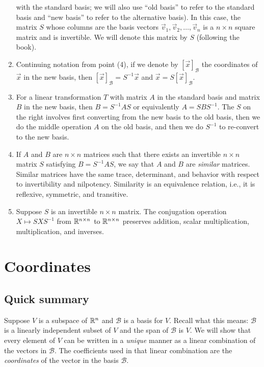 \documentclass[10pt]{amsart}
\begin{document}
\begin{enumerate}
  with the standard basis; we will also use ``old basis'' to refer to
  the standard basis and ``new basis'' to refer to the alternative
  basis). In this case, the matrix $S$ whose columns are the basis
  vectors $\vec{v}_1, \vec{v}_2, \dots, \vec{v}_n$ is a $n \times n$
  square matrix and is invertible. We will denote this matrix by $S$
  (following the book).
\item Continuing notation from point (4), if we denote by
  $[\vec{x}]_{\mathcal{B}}$ the coordinates of $\vec{x}$ in the new
  basis, then $[\vec{x}]_{\mathcal{B}} = S^{-1}\vec{x}$ and $\vec{x} =
  S[\vec{x}]_{\mathcal{B}}$.
\item For a linear transformation $T$ with matrix $A$ in the standard
  basis and matrix $B$ in the new basis, then $B = S^{-1}AS$ or
  equivalently $A = SBS^{-1}$. The $S$ on the right involves first
  converting from the new basis to the old basis, then we do the
  middle operation $A$ on the old basis, and then we do $S^{-1}$ to
  re-convert to the new basis.
\item If $A$ and $B$ are $n \times n$ matrices such that there exists
  an invertible $n \times n$ matrix $S$ satisfying $B = S^{-1}AS$, we
  say that $A$ and $B$ are {\em similar} matrices. Similar matrices
  have the same trace, determinant, and behavior with respect to
  invertibility and nilpotency. Similarity is an equivalence relation,
  i.e., it is reflexive, symmetric, and transitive.
\item Suppose $S$ is an invertible $n \times n$ matrix. The
  conjugation operation $X \mapsto SXS^{-1}$ from $\mathbb{R}^{n \times n}$ to
  $\mathbb{R}^{n \times n}$ preserves addition, scalar multiplication,
  multiplication, and inverses.
\end{enumerate}
\section{Coordinates}

\subsection{Quick summary}

Suppose $V$ is a subspace of $\mathbb{R}^n$ and $\mathcal{B}$ is a basis for
$V$. Recall what this means: $\mathcal{B}$ is a linearly independent
subset of $V$ and the span of $\mathcal{B}$ is $V$. We will show that
every element of $V$ can be written in a {\em unique} manner as a
linear combination of the vectors in $\mathcal{B}$. The coefficients
used in that linear combination are the {\em coordinates} of the
vector in the basis $\mathcal{B}$.
\end{document}

